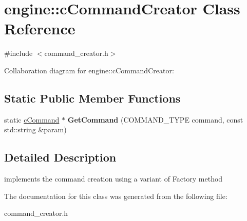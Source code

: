 \hypertarget{classengine_1_1cCommandCreator}{\section{engine\-:\-:c\-Command\-Creator Class Reference}
\label{classengine_1_1cCommandCreator}
}


{\ttfamily \#include $<$command\-\_\-creator.\-h$>$}



Collaboration diagram for engine\-:\-:c\-Command\-Creator\-:
\subsection*{Static Public Member Functions}
\begin{DoxyCompactItemize}
\item 
\hypertarget{classengine_1_1cCommandCreator_afced57cc0c6330127f73929878031911}{static \hyperlink{classengine_1_1cCommand}{c\-Command} $\ast$ {\bfseries Get\-Command} (C\-O\-M\-M\-A\-N\-D\-\_\-\-T\-Y\-P\-E command, const std\-::string \&param)}\label{classengine_1_1cCommandCreator_afced57cc0c6330127f73929878031911}

\end{DoxyCompactItemize}


\subsection{Detailed Description}
implements the command creation using a variant of Factory method 

The documentation for this class was generated from the following file\-:\begin{DoxyCompactItemize}
\item 
command\-\_\-creator.\-h\end{DoxyCompactItemize}
